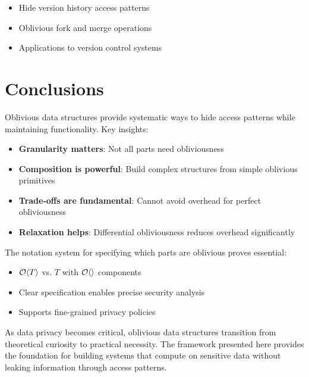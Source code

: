 \documentclass[11pt,final,hidelinks]{article}
\begin{document}
\begin{itemize}
    \item Hide version history access patterns
    \item Oblivious fork and merge operations
    \item Applications to version control systems
\end{itemize}

\section{Conclusions}

Oblivious data structures provide systematic ways to hide access patterns while maintaining functionality. Key insights:

\begin{itemize}
    \item \textbf{Granularity matters}: Not all parts need obliviousness
    \item \textbf{Composition is powerful}: Build complex structures from simple oblivious primitives
    \item \textbf{Trade-offs are fundamental}: Cannot avoid overhead for perfect obliviousness
    \item \textbf{Relaxation helps}: Differential obliviousness reduces overhead significantly
\end{itemize}

The notation system for specifying which parts are oblivious proves essential:
\begin{itemize}
    \item $\mathcal{O}\langle T \rangle$ vs. $T$ with $\mathcal{O}\langle  \rangle$ components
    \item Clear specification enables precise security analysis
    \item Supports fine-grained privacy policies
\end{itemize}

As data privacy becomes critical, oblivious data structures transition from theoretical curiosity to practical necessity. The framework presented here provides the foundation for building systems that compute on sensitive data without leaking information through access patterns.


\end{document}
